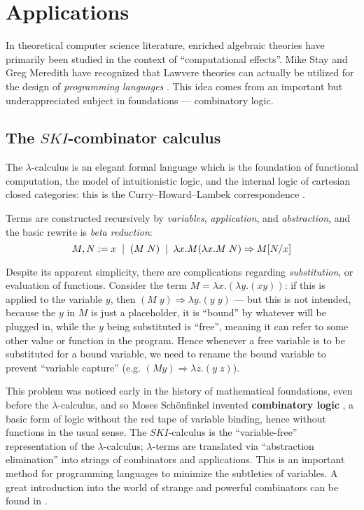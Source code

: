 \documentclass{amsart}
\theoremstyle{definition}
\begin{document}
\section{Applications}

In theoretical computer science literature, enriched algebraic theories have primarily been studied in the context of ``computational effects''. Mike Stay and Greg Meredith have recognized that Lawvere theories can actually be utilized for the design of \textit{programming languages} \cite{ladl}. This idea comes from an important but underappreciated subject in foundations --- combinatory logic.

\subsection{The $SKI$-combinator calculus}

The $\lambda$-calculus is an elegant formal language which is the foundation of functional computation, the model of intuitionistic logic, and the internal logic of cartesian closed categories: this is the Curry--Howard--Lambek correspondence \cite{baezstay}.

Terms are constructed recursively by \textit{variables}, \textit{application}, and \textit{abstraction}, and the basic rewrite is \textit{beta reduction}: 
\[ M,N := x \;\; | \;\; (M\; N) \;\; | \;\; \lambda x.M$$ $$(\lambda x.M\; N) \Rightarrow M[N/x] \]

Despite its apparent simplicity, there are complications regarding \textit{substitution}, or evaluation of functions. Consider the term $M = \lambda x.(\lambda y.(xy))$: if this is applied to the variable $y$, then $(M\; y) \Rightarrow \lambda y.(y\; y)$ --- but this is not intended, because the $y$ in $M$ is just a placeholder, it is ``bound'' by whatever will be plugged in, while the $y$ being substituted is ``free'', meaning it can refer to some other value or function in the program. Hence whenever a free variable is to be substituted for a bound variable, we need to rename the bound variable to prevent ``variable capture'' (e.g. $(M y) \Rightarrow \lambda z.(y\; z)$).

This problem was noticed early in the history of mathematical foundations, even before the $\lambda$-calculus, and so Moses Sch\"onfinkel invented \textbf{combinatory logic} \cite{combs}, a basic form of logic without the red tape of variable binding, hence without functions in the usual sense. The $SKI$-calculus is the ``variable-free'' representation of the $\lambda$-calculus; $\lambda$-terms are translated via ``abstraction elimination'' into strings of combinators and applications. This is an important method for programming languages to minimize the subtleties of variables. A great introduction into the world of strange and powerful combinators can be found in \cite{tmam}.
\end{document}
